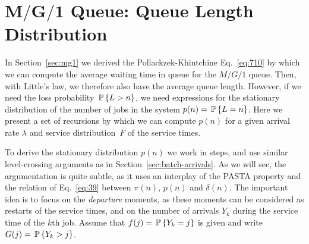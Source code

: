 \section
[$M/G/1$ Queue: Queue Length Distribution]
{$\mathbf{M/G/1}$ Queue: Queue Length Distribution}
\label{sec:distr-queue-length}

In Section~\ref{sec:mg1} we derived the Pollackzek-Khintchine
Eq.~\eqref{eq:710} by which we can compute the average waiting time in
queue for the $M/G/1$ queue. Then, with Little's law, we therefore
also have the average queue length. However, if we need the loss
probability $\P{L>n}$, we need expressions for the stationary
distribution of the number of jobs in the system $p(n)=\P{L=n}$.  Here
we present a set of recursions by which we can compute $p(n)$ for
a given arrival rate $\lambda$ and service distribution~$F$ of the
service times.

To derive the stationary distribution $p(n)$ we work in steps, and use
similar level-crossing arguments as in
Section~\ref{sec:batch-arrivals}.  As we will see, the argumentation
is quite subtle, as it uses an interplay of the PASTA property and the
relation of Eq.~\eqref{eq:39} between $\pi(n)$, $p(n)$ and
$\delta(n)$. The important idea is to focus on the \emph{departure}
moments, as these moments can be considered as restarts of the service
times, and on the number of arrivals $Y_k$ during the service time of
the $k$th job.  Assume that $f(j) = \P{Y_k = j}$ is given and write
$G(j) = \P{Y_k > j}$.



